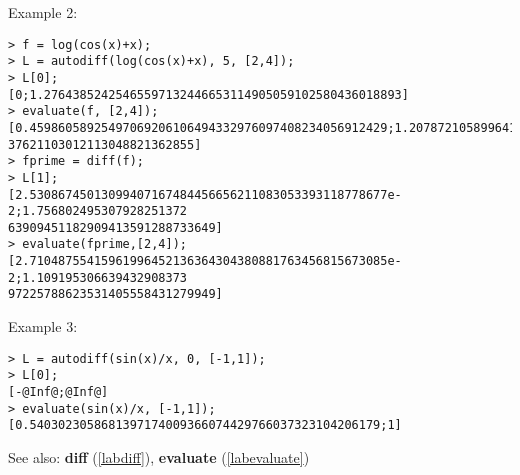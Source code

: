\noindent Example 2: 
\begin{center}\begin{minipage}{15cm}\begin{Verbatim}[frame=single]
> f = log(cos(x)+x);
> L = autodiff(log(cos(x)+x), 5, [2,4]);
> L[0];
[0;1.27643852425465597132446653114905059102580436018893]
> evaluate(f, [2,4]);
[0.45986058925497069206106494332976097408234056912429;1.207872105899641695959010
37621103012113048821362855]
> fprime = diff(f);
> L[1];
[2.53086745013099407167484456656211083053393118778677e-2;1.756802495307928251372
63909451182909413591288733649]
> evaluate(fprime,[2,4]);
[2.71048755415961996452136364304380881763456815673085e-2;1.109195306639432908373
97225788623531405558431279949]
\end{Verbatim}
\end{minipage}\end{center}
\noindent Example 3: 
\begin{center}\begin{minipage}{15cm}\begin{Verbatim}[frame=single]
> L = autodiff(sin(x)/x, 0, [-1,1]);
> L[0];
[-@Inf@;@Inf@]
> evaluate(sin(x)/x, [-1,1]);
[0.5403023058681397174009366074429766037323104206179;1]
\end{Verbatim}
\end{minipage}\end{center}
See also: \textbf{diff} (\ref{labdiff}), \textbf{evaluate} (\ref{labevaluate})
